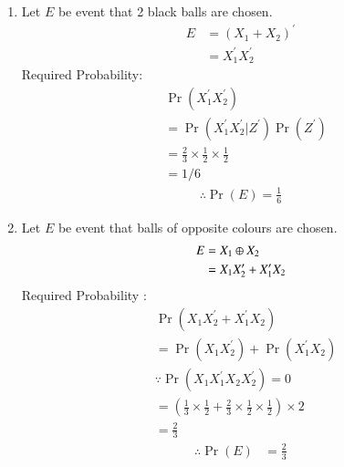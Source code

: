 \documentclass[journal,12pt,twocolumn]{IEEEtran}
\providecommand{\pr}[1]{\ensuremath{\Pr\left(#1\right)}}
\begin{document}
% 		

 
\begin{enumerate}[label =(\alph*)]
\item Let $E$ be event that 2 black balls are chosen.
\begin{align}
E &= (X_1+X_2)^\prime  \\
&= X_1^\prime X_2^\prime
\end{align}
Required Probability:
\begin{align}  
&\pr{X_1^\prime X_2^\prime} \\ \nonumber
&=\pr{X_1^\prime X_2^\prime | Z^\prime}\pr{Z^\prime} \\ \nonumber
&= \frac{2}{3}\times\frac{1}{2}\times\frac{1}{2} \\ \label{eq:1}
&= 1/6 
\end{align}
\begin{align}
\therefore \pr{E} = \frac{1}{6} 
\end{align}
\item Let $E$ be event that balls of opposite colours are chosen.
\begin{align}
E &= X_1 \oplus X_2 \\
&= X_1 X_2^\prime + X_1^\prime X_2
\end{align}
Required Probability : 
\begin{align}
&\pr{X_1 X_2^\prime + X_1^\prime X_2} \\
&=\pr{X_1 X_2^\prime} + \pr{X_1^\prime X_2} \\
&\because \pr{X_1 X_1 ^\prime X_2 X_2 ^\prime} = 0 \\
&=(\frac{1}{3}\times\frac{1}{2} + \frac{2}{3}\times\frac{1}{2}\times\frac{1}{2})\times 2 \\
&=\frac{2}{3}
\end{align}
\begin{align}
\therefore \pr{E} &= \frac{2}{3}
\end{align}
\end{enumerate}
\end{document}
